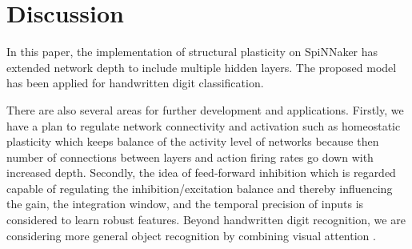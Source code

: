 \documentclass[sigconf]{acmart}
\begin{document}
\section{Discussion}
% 
In this paper, the implementation of structural plasticity on SpiNNaker has extended network depth to include multiple hidden layers. 
The proposed model has been applied for handwritten digit classification. 

There are also several areas for further development and applications.
Firstly, we have a plan to regulate network connectivity and activation  such as homeostatic plasticity \cite{Tien2018} which keeps balance of the activity level of networks because then number of connections between layers and action firing rates go down with increased depth. 
Secondly, the idea of feed-forward inhibition which is regarded capable of regulating the inhibition/excitation balance and thereby influencing the gain, the integration window, and the temporal precision of inputs \cite{DSouza2016} is considered to learn robust features. 
Beyond handwritten digit recognition, we are considering more general object recognition by combining visual attention \cite{Rea2013}.

%
%






\end{document}
